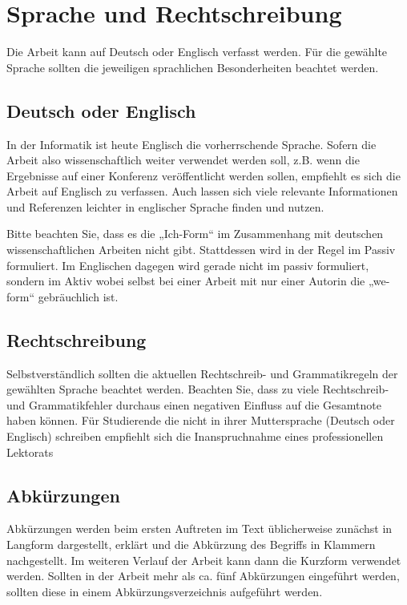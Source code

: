 \section{Sprache und Rechtschreibung}\label{sec:language}
%
Die Arbeit kann auf Deutsch oder Englisch verfasst werden. Für die gewählte Sprache sollten die jeweiligen sprachlichen Besonderheiten beachtet werden.

\subsection{Deutsch oder Englisch}\label{sec:language:german_and_english}
%
In der Informatik ist heute Englisch die vorherrschende Sprache. Sofern die Arbeit also wissenschaftlich weiter verwendet werden soll, z.B. wenn die Ergebnisse auf einer Konferenz veröffentlicht werden sollen, empfiehlt es sich die Arbeit auf Englisch zu verfassen. Auch lassen sich viele relevante Informationen und Referenzen leichter in englischer Sprache finden und nutzen.

Bitte beachten Sie, dass es die „Ich-Form“ im Zusammenhang mit deutschen wissenschaftlichen Arbeiten nicht gibt. Stattdessen wird in der Regel im Passiv formuliert. Im Englischen dagegen wird gerade nicht im passiv formuliert, sondern im Aktiv wobei selbst bei einer Arbeit mit nur einer Autorin die „we-form“ gebräuchlich ist.

\subsection{Rechtschreibung}\label{sec:language:spelling}
%
Selbstverständlich sollten die aktuellen Rechtschreib- und Grammatikregeln der gewählten Sprache beachtet werden. Beachten Sie, dass zu viele Rechtschreib- und Grammatikfehler durchaus einen negativen Einfluss auf die Gesamtnote haben können. Für Studierende die nicht in ihrer Muttersprache (Deutsch oder Englisch) schreiben empfiehlt sich die Inanspruchnahme eines professionellen Lektorats

\subsection{Abkürzungen}\label{sec:language:abbrevations}
%
Abkürzungen werden beim ersten Auftreten im Text üblicherweise zunächst in Langform dargestellt, erklärt und die Abkürzung des Begriffs in Klammern nachgestellt. Im weiteren Verlauf der Arbeit kann dann die Kurzform verwendet werden. Sollten in der Arbeit mehr als ca. fünf Abkürzungen eingeführt werden, sollten diese in einem Abkürzungsverzeichnis aufgeführt werden.
\medskip

